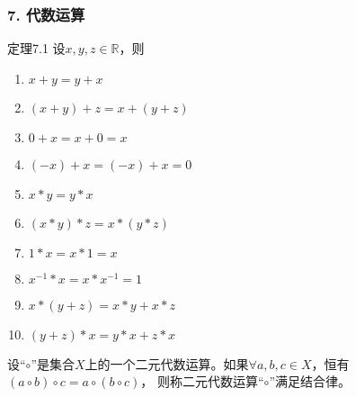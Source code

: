 \documentclass{beamer}
\begin{document}
\begin{CJK*}{UTF8}{gbsn}
\begin{frame}
  \frametitle{7. 代数运算}
  \begin{minipage}[t]{0.49\linewidth}
  \begin{block}{定理7.1}
    设$x, y, z \in \mathbb{R}$，则
   \begin{enumerate}
   \item   $x + y = y + x$
   \item   $(x + y) + z = x + (y + z)$
   \item   $0 + x = x + 0 = x$
   \item   $(-x) + x = (-x) + x = 0$
   \item   $x * y = y * x$
   \item   $(x * y) * z = x * (y *z)$
   \item   $1 * x = x * 1 = x$
   \item   $x^{-1} * x = x * x^{-1} = 1$
   \item   $x* (y + z) = x * y + x * z$
   \item   $(y + z) * x = y * x + z * x$
    \end{enumerate}
  \end{block}\pause
\end{minipage}
\begin{minipage}[t]{0.49\linewidth}
  \begin{Def}
    设“$\circ$”是集合$X$上的一个二元代数运算。如果$\forall a, b, c \in X$，恒有$(a \circ b) \circ c = a \circ (b \circ c)$， 则称二元代数运算“$\circ$”满足\alert{结合律}。
  \end{Def}
\end{minipage}
\end{frame}


\end{CJK*}
\end{document}
